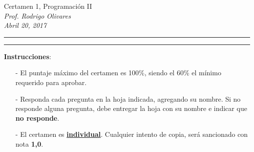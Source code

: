 \documentclass[10pt]{article}
\begin{document}
\begin{center}
    {\Large  Certamen 1, Programaci\'on II} \\
    \emph{\small Prof. Rodrigo Olivares} \\
    \emph{\scriptsize Abril 20, 2017}
\end{center}
\vspace*{-35pt}
\begin{center}
    \rule{1\textwidth}{.3pt}
\end{center}
\vspace*{-42pt}
\begin{center}
    \rule{1\textwidth}{2pt}
\end{center}

\vspace*{-15pt}
{\small \textbf{Instrucciones}:}
\vspace*{-15pt}

{\scriptsize
\begin{itemize}
    \item[-] El puntaje m\'aximo del certamen es 100\%, siendo el 60\% el m\'inimo requerido para aprobar.
    \item[-] Responda cada pregunta en la hoja indicada, agregando su nombre. Si no responde alguna pregunta, debe entregar la hoja con su nombre e indicar que \textbf{no responde}.
    \item[-] El certamen es \underline{\textbf{individual}}. Cualquier intento de copia, ser\'a sancionado con nota \textbf{1,0}.
\end{itemize}
}
\vspace*{-20pt}
\end{document}
